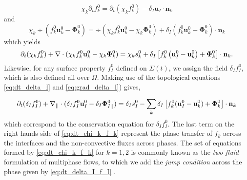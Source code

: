 \begin{equation}
\chi _k \partial _t f_k^0 =  \partial _t (\chi _kf_k^0) -  \delta_I \mathbf{u}_I \cdot\mathbf{n}_k
\end{equation}
and 
\begin{equation}
\chi _k \div (f_k^0 \textbf{u}_k^0 - \mathbf{\Phi}_k^0) =  \div (\chi _kf_k^0 \textbf{u}_k^0 - \chi _k\mathbf{\Phi}_k^0) + \delta_I (f_k^0 \textbf{u}_k^0 - \mathbf{\Phi}_k^0)\cdot\mathbf{n}_k
\end{equation}
which yields
\begin{equation}
    \partial_t (\chi_k f_k^0)
    + \mathbf{\nabla}\cdot (
        \chi_k f_k^0 \textbf{u}_k^0
        - \chi_k \mathbf{\Phi}_k^0 
        )
    = 
    \chi_k s_k^0
    + \delta_I\left[
        f_k^0
        \left(
            \textbf{u}_I^0
            - \textbf{u}_k^0
        \right)
        + \mathbf{\Phi}_k^0
    \right]
    \cdot \textbf{n}_k.
    \label{eq:dt_chi_k_f_k}
\end{equation}
Likewise, for any surface property $f_I^0$ defined on $\Sigma(t)$, we assign the field $\delta_I f_I^0$, which is also defined all over $\Omega$. Making use of the topological equations \ref{eq:dt_delta_I} and \ref{eq:grad_delta_I}) gives,

 
\begin{equation}
    \partial_t (\delta_If_I^0)  
    + \mathbf{\nabla}_{||}\cdot (
        \delta_I f_I^0 \textbf{u}_I^0
        - \delta_I \mathbf{\Phi}_{I||}^0 
        )
    = 
    \delta_Is_I^0
    - \sum_k \delta_I\left[
    f_k^0 (\textbf{u}_I^0 - \textbf{u}_k^0)
    + \mathbf{\Phi}_k^0
    \right] \cdot \textbf{n}_k 
    \label{eq:dt_delta_I_f_I}
\end{equation}
which correspond to the conservation equation for $\delta_If_I^0$. %
The last term on the right hands side of \ref{eq:dt_chi_k_f_k} represent the phase transfer of $f_k$ across the interfaces and the non-convective fluxes across phases.
The set of equations formed by \ref{eq:dt_chi_k_f_k} for $k =1,2$ is commonly known as the \textit{two-fluid} formulation of multiphase flows, to which we add the \textit{jump condition} across the phase given by \ref{eq:dt_delta_I_f_I} \citep{morel2015mathematical,tryggvason2011direct,drew1983mathematical,kataoka1986local}. 

